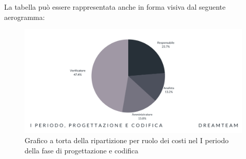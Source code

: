 La tabella può essere rappresentata anche in forma visiva dal seguente aerogramma:
\begin{figure}[H]
\centering
\includegraphics[scale=0.65]{Sezioni/SezioniPreventivo/grafici/Progettazione_I_periodo_costi.png}
\caption{Grafico a torta della ripartizione per ruolo dei costi nel I periodo della fase di progettazione e codifica}
\end{figure}



